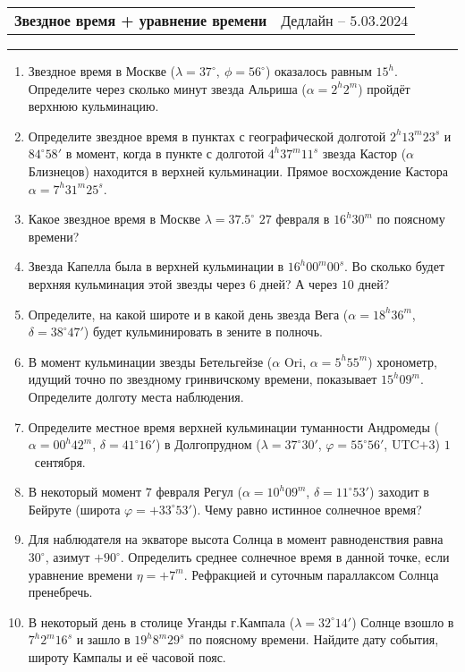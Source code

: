 \documentclass[12pt]{article}
\begin{document}
 \begin{tabularx}{\textwidth}{Xr}
  {\Large \textbf{Звездное время + уравнение времени}} & Дедлайн -- $5.03.2024$ \\
 \end{tabularx}
 \noindent\rule{\textwidth}{0.4pt}
 \begin{enumerate}
        \item Звездное время в Москве ($\lambda=37^\circ,~\phi =56^{\circ}$) оказалось равным $15^h$. Определите через сколько минут звезда Альриша ($\alpha=2^h 2^m$) пройдёт верхнюю кульминацию.
        \item Определите звездное время в пунктах с географической долготой $2^h13^m23^s$ и $84^{\circ}58'$ в момент, когда в пункте с долготой $4^h37^m11^s$ звезда Кастор ($\alpha$ Близнецов) находится в верхней кульминации. Прямое восхождение Кастора $\alpha=7^h31^m25^s$.
        \item  Какое  звездное время в Москве $\lambda=37.5^{\circ}$ $27$ февраля в $16^h 30^m$ по поясному времени?
        \item Звезда Капелла была в верхней кульминации в $16^h 00^m 00^s$. Во сколько будет верхняя кульминация этой звезды через $6$ дней? А через $10$ дней?
        \item Определите, на какой широте и в какой день звезда Вега ($\alpha=18^h 36^m$, $\delta=38^{\circ} 47'$) будет кульминировать в зените в полночь.
        \item В момент кульминации звезды Бетельгейзе ($\alpha$ Ori, $\alpha=5^h 55^m$) хронометр, идущий точно по звездному гринвичскому времени, показывает $15^h 09^m$. Определите долготу места наблюдения.
        \item Определите местное время верхней кульминации туманности Андромеды ($\alpha=00^h 42^m$, $\delta=41^{\circ}16'$) в Долгопрудном ($\lambda=37^{\circ}30'$, $\varphi=55^{\circ}56'$, UTC$+3$) $1$~сентября.
        \item В некоторый момент $7$ февраля Регул ($\alpha = 10^h 09^m$, $\delta = 11^{\circ} 53'$) заходит в Бейруте (широта $\varphi = +33^{\circ} 53'$). Чему равно истинное солнечное время?
        \item Для наблюдателя на экваторе высота Солнца в момент равноденствия равна $30^{\circ}$,	азимут $+90^{\circ}$. Определить среднее солнечное время в данной точке, если уравнение времени $\eta =+7^m$. Рефракцией и суточным параллаксом Солнца пренебречь.
        \item В некоторый день в столице Уганды г.Кампала ($\lambda = 32^{\circ} 14'$) Солнце взошло в $7^h2^m16^s$ и зашло в $19^h8^m29^s$ по поясному времени. Найдите дату события, широту Кампалы и её часовой пояс.
 \end{enumerate}
\end{document}
